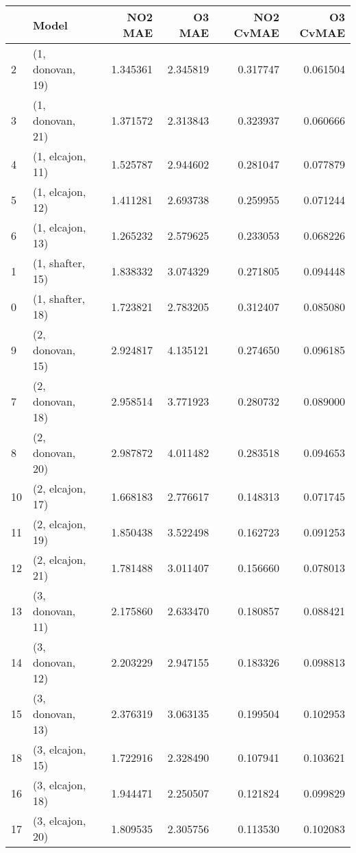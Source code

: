 \begin{tabular}{llrrrr}
\toprule
{} &             Model &   NO2 MAE &    O3 MAE &  NO2 CvMAE &  O3 CvMAE \\
\midrule
2  &  (1, donovan, 19) &  1.345361 &  2.345819 &   0.317747 &  0.061504 \\
3  &  (1, donovan, 21) &  1.371572 &  2.313843 &   0.323937 &  0.060666 \\
4  &  (1, elcajon, 11) &  1.525787 &  2.944602 &   0.281047 &  0.077879 \\
5  &  (1, elcajon, 12) &  1.411281 &  2.693738 &   0.259955 &  0.071244 \\
6  &  (1, elcajon, 13) &  1.265232 &  2.579625 &   0.233053 &  0.068226 \\
1  &  (1, shafter, 15) &  1.838332 &  3.074329 &   0.271805 &  0.094448 \\
0  &  (1, shafter, 18) &  1.723821 &  2.783205 &   0.312407 &  0.085080 \\
9  &  (2, donovan, 15) &  2.924817 &  4.135121 &   0.274650 &  0.096185 \\
7  &  (2, donovan, 18) &  2.958514 &  3.771923 &   0.280732 &  0.089000 \\
8  &  (2, donovan, 20) &  2.987872 &  4.011482 &   0.283518 &  0.094653 \\
10 &  (2, elcajon, 17) &  1.668183 &  2.776617 &   0.148313 &  0.071745 \\
11 &  (2, elcajon, 19) &  1.850438 &  3.522498 &   0.162723 &  0.091253 \\
12 &  (2, elcajon, 21) &  1.781488 &  3.011407 &   0.156660 &  0.078013 \\
13 &  (3, donovan, 11) &  2.175860 &  2.633470 &   0.180857 &  0.088421 \\
14 &  (3, donovan, 12) &  2.203229 &  2.947155 &   0.183326 &  0.098813 \\
15 &  (3, donovan, 13) &  2.376319 &  3.063135 &   0.199504 &  0.102953 \\
18 &  (3, elcajon, 15) &  1.722916 &  2.328490 &   0.107941 &  0.103621 \\
16 &  (3, elcajon, 18) &  1.944471 &  2.250507 &   0.121824 &  0.099829 \\
17 &  (3, elcajon, 20) &  1.809535 &  2.305756 &   0.113530 &  0.102083 \\
\bottomrule
\end{tabular}
